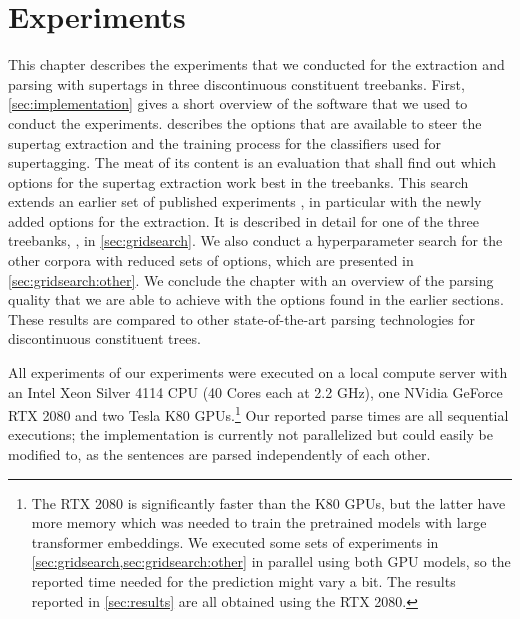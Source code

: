 \documentclass[../document.tex]{subfiles}
\begin{document}
    \chapter{Experiments}\label{sec:experiments}
    
    This chapter describes the experiments that we conducted for the extraction and parsing with supertags in three discontinuous constituent treebanks.
    First, \cref{sec:implementation} gives a short overview of the software that we used to conduct the experiments.
     describes the options that are available to steer the supertag extraction and the training process for the classifiers used for supertagging.
    The meat of its content is an evaluation that shall find out which options for the supertag extraction work best in the treebanks.
    This search extends an earlier set of published experiments \citep{Rup22}, in particular with the newly added options for the extraction.
    It is described in detail for one of the three treebanks, \negra{}, in \cref{sec:gridsearch}.
    We also conduct a hyperparameter search for the other corpora with reduced sets of options, which are presented in \cref{sec:gridsearch:other}.
    We conclude the chapter with an overview of the parsing quality that we are able to achieve with the options found in the earlier sections.
    These results are compared to other state-of-the-art parsing technologies for discontinuous constituent trees.

    All experiments of our experiments were executed on a local compute server with an Intel Xeon Silver 4114 CPU (40 Cores each at 2.2 GHz), one NVidia GeForce RTX 2080 and two Tesla K80 GPUs.\footnote{
        The RTX 2080 is significantly faster than the K80 GPUs, but the latter have more memory which was needed to train the pretrained models with large transformer embeddings.
        We executed some sets of experiments in \cref{sec:gridsearch,sec:gridsearch:other} in parallel using both GPU models, so the reported time needed for the prediction might vary a bit.
        The results reported in \cref{sec:results} are all obtained using the RTX 2080. 
    }
    Our reported parse times are all sequential executions; the implementation is currently not parallelized but could easily be modified to, as the sentences are parsed independently of each other.
    
    
    
    
    
    

    \ifSubfilesClassLoaded{%
        \printindex
    }{}
\end{document}
